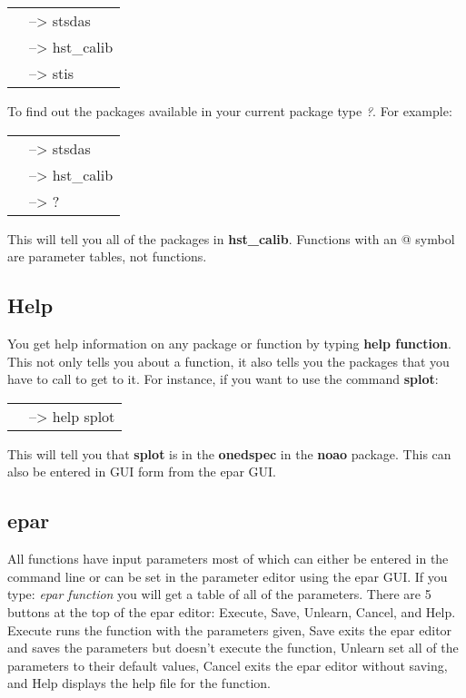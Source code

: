 \begin{minipage}{4in}
\setlength{\oddsidemargin}{0.25 in}
\setlength{\evensidemargin}{0.25 in}
\begin{tabular}{ll}
& {\color{RoyalBlue}--> stsdas}\\
& {\color{RoyalBlue}--> hst\_calib}\\
&{\color{RoyalBlue}--> stis}\\
\end{tabular}
\end{minipage}

To find out the packages available in your current package type \emph{?}. For example:

\begin{minipage}{4in}
\setlength{\oddsidemargin}{0.25 in}
\setlength{\evensidemargin}{0.25 in}
\begin{tabular}{ll}
& {\color{RoyalBlue}--> stsdas}\\
& {\color{RoyalBlue}--> hst\_calib}\\
& {\color{RoyalBlue}--> ?}\\
\end{tabular}
\end{minipage}

This will tell you all of the packages in {\bf hst\_calib}. Functions with an @ symbol are parameter tables, not functions.

\subsection{Help}
You get help information on any package or function by typing {\bf help function}. This not only tells you about a function, it also tells you the packages that you have to call to get to it. For instance, if you want to use the command {\bf splot}:

\begin{minipage}{4in}
\setlength{\oddsidemargin}{0.25 in}
\setlength{\evensidemargin}{0.25 in}
\begin{tabular}{ll}
& {\color{RoyalBlue}--> help splot}
\end{tabular}
\end{minipage}

This will tell you that {\bf splot} is in the {\bf onedspec} in the {\bf noao} package. This can also be entered in GUI form from the epar GUI. 

\subsection{epar}
All functions have input parameters most of which can either be entered in the command line or can be set in the parameter editor using the epar GUI. If you type: \emph{epar function} you will get a table of all of the parameters. There are 5 buttons at the top of the epar editor: Execute, Save, Unlearn, Cancel, and Help. Execute runs the function with the parameters given, Save exits the epar editor and saves the parameters but doesn't execute the function, Unlearn set all of the parameters to their default values, Cancel exits the epar editor without saving, and Help displays the help file for the function. 


